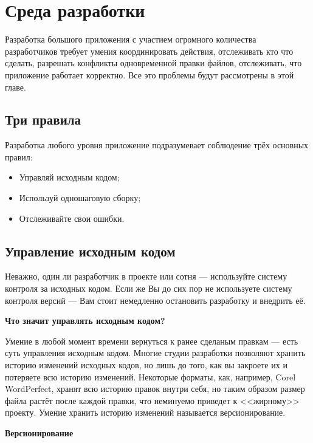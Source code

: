 \chapter{ Среда разработки } \label{chapt2}


Разработка большого приложения с участием огромного количества разработчиков требует умения координировать действия, отслеживать кто что сделать, разрешать конфликты одновременной правки файлов, отслеживать, что приложение работает корректно. Все это проблемы будут рассмотрены в этой главе.

\section{ Три правила} \label{sect2_1}

Разработка любого уровня приложение подразумевает соблюдение трёх основных правил:
\begin{itemize}
\item Управляй исходным кодом;
\item Используй одношаговую сборку;
\item Отслеживайте свои ошибки.

\end{itemize}

\section{ Управление исходным кодом} \label{sect2_2}

Неважно, один ли разработчик в проекте или сотня --- используйте систему контроля за исходных кодом. Если же Вы до сих пор не используете систему контроля версий --- Вам стоит немедленно остановить разработку и внедрить её.

\textbf{ Что значит управлять исходным кодом?} %

Умение в любой момент времени вернуться к ранее сделаным правкам --- есть суть управления исходным кодом. Многие студии разработки позволяют хранить историю изменений исходных кодов, но лишь до того, как вы закроете их и потеряете всю историю изменений. Некоторые форматы, как, например, Corel WordPerfect, хранят всю историю правок внутри себя, но таким образом размер файла растёт после каждой правки, что неминуемо приведет к <<жирному>> проекту. Умение хранить историю изменений называется версионирование.

\textbf{ Версионирование } %

